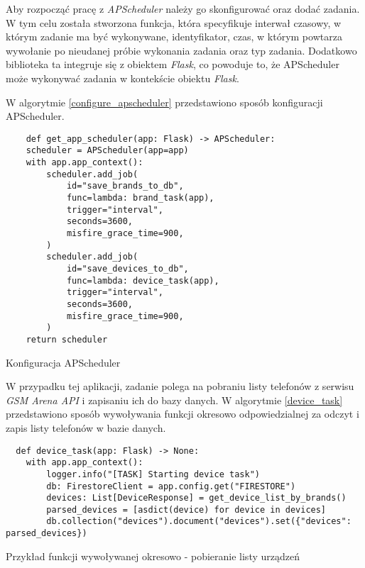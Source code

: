 Aby rozpocząć pracę z \textit{APScheduler} należy go skonfigurować oraz dodać zadania. W tym celu została stworzona funkcja, która specyfikuje interwał czasowy, w którym zadanie ma być wykonywane, identyfikator, czas, w którym powtarza wywołanie po nieudanej próbie wykonania zadania oraz typ zadania. Dodatkowo biblioteka ta integruje się z obiektem \textit{Flask}, co powoduje to, że APScheduler może wykonywać zadania w kontekście obiektu \textit{Flask}.

W algorytmie \ref{configure_apscheduler} przedstawiono sposób konfiguracji APScheduler.

\begin{code}[H]
  \begin{verbatim}
    def get_app_scheduler(app: Flask) -> APScheduler:
    scheduler = APScheduler(app=app)
    with app.app_context():
        scheduler.add_job(
            id="save_brands_to_db",
            func=lambda: brand_task(app),
            trigger="interval",
            seconds=3600,
            misfire_grace_time=900,
        )
        scheduler.add_job(
            id="save_devices_to_db",
            func=lambda: device_task(app),
            trigger="interval",
            seconds=3600,
            misfire_grace_time=900,
        )
    return scheduler
  \end{verbatim}
  \caption{Konfiguracja APScheduler}
  \label{configure_apscheduler}
\end{code}

W przypadku tej aplikacji, zadanie polega na pobraniu listy telefonów z serwisu \textit{GSM Arena API} i zapisaniu ich do bazy danych. W algorytmie \ref{device_task} przedstawiono sposób wywoływania funkcji okresowo odpowiedzialnej za odczyt i zapis listy telefonów w bazie danych.

\begin{code}[H]
  \begin{verbatim}
  def device_task(app: Flask) -> None:
    with app.app_context():
        logger.info("[TASK] Starting device task")
        db: FirestoreClient = app.config.get("FIRESTORE")
        devices: List[DeviceResponse] = get_device_list_by_brands()
        parsed_devices = [asdict(device) for device in devices]
        db.collection("devices").document("devices").set({"devices": parsed_devices})
  \end{verbatim}
  \caption{Przykład funkcji wywoływanej okresowo - pobieranie listy urządzeń}
  \label{device_task}
\end{code}

